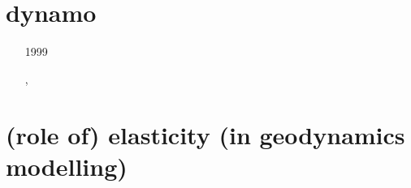 \section{dynamo}

\begin{small}
\begin{itemize}
\item[1999] 
\item[\twothousandfive] 
\item[\twothousandnine] 
\item[\twothousandeleven] 
\item[\twothousandthirteen] , 
\item[\twothousandsixteen] 
\end{itemize}
\end{small}

\section{(role of) elasticity (in geodynamics modelling)}

